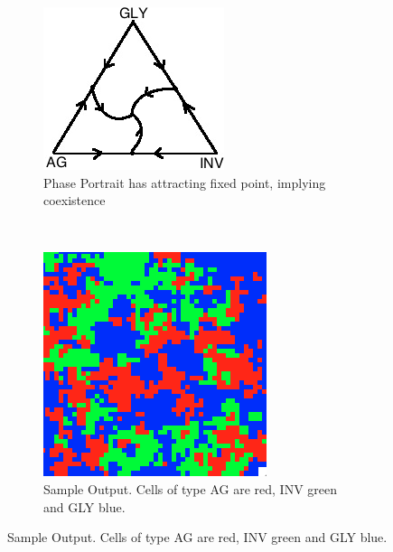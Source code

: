 \documentclass[12pt]{amsart}
\begin{document}
\begin{figure}[ht]
	\begin{subfigure}[b]{0.4 \textwidth}
		\includegraphics[width = 0.9 \textwidth]{Diagrams/Basanta/phase}
		\caption{Phase Portrait has attracting fixed point, implying coexistence}
	\end{subfigure}
	~
	\begin{subfigure}[b]{0.4 \textwidth}
		\includegraphics[width = 0.9 \textwidth]{Diagrams/Basanta/sample}
		\caption{Sample Output. Cells of type AG are red, INV green and GLY blue.}
	\end{subfigure}


\end{figure}
\end{document}
